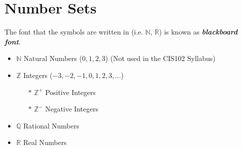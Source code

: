 \documentclass[]{report}
\begin{document}
\section{Number Sets}
The font that the symbols are written in (i.e. $\mathbb{N}$, $\mathbb{R}$) is known as \textit{\textbf{blackboard font}}.
\begin{itemize}
	\item $\mathbb{N}$ Natural Numbers ($0,1,2,3$) 
	(Not used in the CIS102 Syllabus)
	\item $\mathbb{Z}$ Integers ($-3,-2,-1,0,1,2,3, \ldots$)
	\begin{itemize}
		\item[$\ast$] $\mathbb{Z}^{+}$ Positive Integers
		\item[$\ast$] $\mathbb{Z}^{-}$ Negative Integers
	\end{itemize}
	\item $\mathbb{Q}$ Rational Numbers
	\item $\mathbb{R}$ Real Numbers
\end{itemize}
\end{document}
